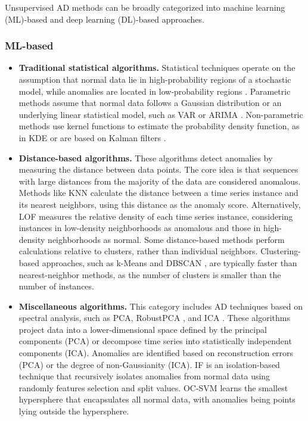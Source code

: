 Unsupervised AD methods can be broadly categorized into machine learning (ML)-based and deep learning (DL)-based approaches.

\subsubsection{ML-based}
\begin{itemize}

     \item \textbf{Traditional statistical algorithms.}  Statistical techniques operate on the assumption that normal data lie in high-probability regions of a stochastic model, while anomalies are located in low-probability regions \cite{chandola2009anomaly}. %
     Parametric methods assume that normal data follows a Gaussian distribution \cite{luo2017gas} or an underlying linear statistical model, such as \ac{VAR} or \ac{ARIMA} \cite{yaacob2010arima}. Non-parametric methods use kernel functions to estimate the probability density function, as in \ac{KDE} \cite{cao2016one} or are based on Kalman filters \cite{knorn2008adaptive}. 
        
    \item \textbf{Distance-based algorithms.} These algorithms detect anomalies by measuring the distance between data points. The core idea is that sequences with large distances from the majority of the data are considered anomalous. Methods like \ac{KNN} \cite{chaovalitwongse2007time} calculate the distance between a time series instance and its nearest neighbors, using this distance as the anomaly score. Alternatively, \ac{LOF} \cite{breunig2000lof} measures the relative density of each time series instance, considering instances in low-density neighborhoods as anomalous and those in high-density neighborhoods as normal. Some distance-based methods perform calculations relative to clusters, rather than individual neighbors. Clustering-based approaches, such as k-Means \cite{kiss2014data} and \ac{DBSCAN} \cite{ester1996density}, are typically faster than nearest-neighbor methods, as the number of clusters is smaller than the number of instances.
    
    
    \item \textbf{Miscellaneous algorithms.} This category includes AD techniques based on spectral analysis, such as \ac{PCA}, RobustPCA \cite{paffenroth2018robust}, and \ac{ICA} \cite{zonglin2009multi}. These algorithms project data into a lower-dimensional space defined by the principal components (PCA) or decompose time series into statistically independent components (ICA). Anomalies are identified based on reconstruction errors (PCA) or the degree of non-Gaussianity (ICA). \ac{IF} \cite{liu2008isolation} is an isolation-based technique that recursively isolates anomalies from normal data using randomly features selection and split values. \ac{OC-SVM} \cite{scholkopf1999support} learns the smallest hypersphere that encapsulates all normal data, with anomalies being points lying outside the hypersphere.
\end{itemize}



